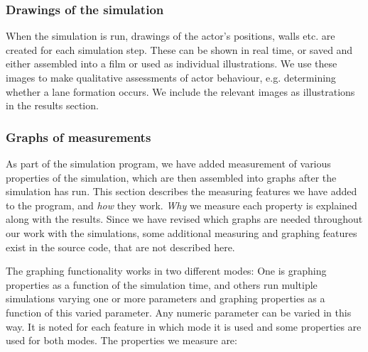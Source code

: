 \subsubsection{Drawings of the simulation}
When the simulation is run, drawings of the actor's positions, walls etc. are 
created for each simulation step. These can be shown in real time, or saved 
and either assembled into a film or used as individual illustrations. We use 
these images to make qualitative assessments of actor behaviour, e.g. 
determining whether a lane formation occurs. We include the relevant images as 
illustrations in the results section.

\subsubsection{Graphs of measurements}
As part of the simulation program, we have added measurement of various 
properties of the simulation, which are then assembled into graphs after the 
simulation has run. This section describes the measuring features we have 
added to the program, and \emph{how} they work. \emph{Why} we measure each 
property is explained along with the results. Since we have revised which 
graphs are needed throughout our work with the simulations, some additional 
measuring and graphing features exist in the source code, that are not 
described here.


The graphing functionality works in two different modes: One is graphing 
properties as a function of the simulation time, and others run multiple 
simulations varying one or more parameters and graphing properties as a 
function of this varied parameter. Any numeric parameter can be varied in this 
way. It is noted for each feature in which mode it is used and some properties 
are used for both modes. The properties we measure are:

